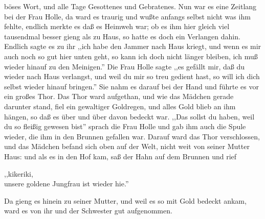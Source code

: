 \documentclass[10pt,a4paper]{article}
\begin{document}
böses Wort, und alle Tage Gesottenes und Gebratenes. Nun war es eine Zeitlang
bei der Frau Holle, da ward es traurig und wußte anfangs selbst nicht was ihm
fehlte, endlich merkte es daß es Heimweh war; ob es ihm hier gleich viel
tausendmal besser gieng als zu Haus, so hatte es doch ein Verlangen dahin.
Endlich sagte es zu ihr ,,ich habe den Jammer nach Haus kriegt, und wenn es mir
auch noch so gut hier unten geht, so kann ich doch nicht länger bleiben, ich muß
wieder hinauf zu den Meinigen.'' Die Frau Holle sagte ,,es gefällt mir, daß du
wieder nach Haus verlangst, und weil du mir so treu gedient hast, so will ich
dich selbst wieder hinauf bringen.'' Sie nahm es darauf bei der Hand und führte
es vor ein großes Thor. Das Thor ward aufgethan, und wie das Mädchen gerade
darunter stand, fiel ein gewaltiger Goldregen, und alles Gold blieb an ihm
hängen, so daß es über und über davon bedeckt war. ,,Das sollst du haben, weil
du so fleißig gewesen bist'' sprach die Frau Holle und gab ihm auch die Spule
wieder, die ihm in den Brunnen gefallen war. Darauf ward das Thor verschlossen,
und das Mädchen befand sich oben auf der Welt, nicht weit von seiner Mutter
Haus: und als es in den Hof kam, saß der Hahn auf dem Brunnen und rief

\vskip 4pt
,,kikeriki, \\
unsere goldene Jungfrau ist wieder hie.''

\vskip 4pt
Da gieng es hinein zu seiner Mutter, und weil es so mit Gold bedeckt ankam, ward
es von ihr und der Schwester gut aufgenommen.
\end{document}
